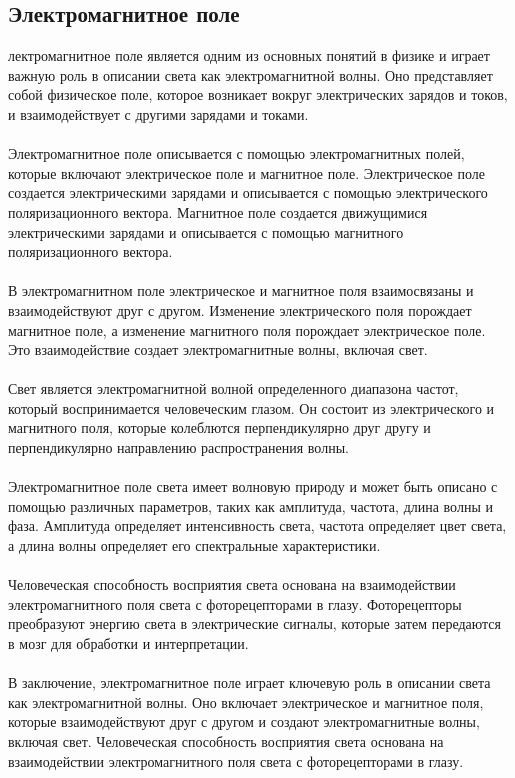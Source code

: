 \documentclass{article}
\begin{document}
\subsection{Электромагнитное поле}
лектромагнитное поле является одним из основных понятий в физике и играет важную роль в описании света как электромагнитной волны. Оно представляет собой физическое поле, которое возникает вокруг электрических зарядов и токов, и взаимодействует с другими зарядами и токами.\\
~\\
Электромагнитное поле описывается с помощью электромагнитных полей, которые включают электрическое поле и магнитное поле. Электрическое поле создается электрическими зарядами и описывается с помощью электрического поляризационного вектора. Магнитное поле создается движущимися электрическими зарядами и описывается с помощью магнитного поляризационного вектора.\\
~\\
В электромагнитном поле электрическое и магнитное поля взаимосвязаны и взаимодействуют друг с другом. Изменение электрического поля порождает магнитное поле, а изменение магнитного поля порождает электрическое поле. Это взаимодействие создает электромагнитные волны, включая свет.\\
~\\
Свет является электромагнитной волной определенного диапазона частот, который воспринимается человеческим глазом. Он состоит из электрического и магнитного поля, которые колеблются перпендикулярно друг другу и перпендикулярно направлению распространения волны.\\
~\\
Электромагнитное поле света имеет волновую природу и может быть описано с помощью различных параметров, таких как амплитуда, частота, длина волны и фаза. Амплитуда определяет интенсивность света, частота определяет цвет света, а длина волны определяет его спектральные характеристики.\\
~\\
Человеческая способность восприятия света основана на взаимодействии электромагнитного поля света с фоторецепторами в глазу. Фоторецепторы преобразуют энергию света в электрические сигналы, которые затем передаются в мозг для обработки и интерпретации.\\
~\\
В заключение, электромагнитное поле играет ключевую роль в описании света как электромагнитной волны. Оно включает электрическое и магнитное поля, которые взаимодействуют друг с другом и создают электромагнитные волны, включая свет. Человеческая способность восприятия света основана на взаимодействии электромагнитного поля света с фоторецепторами в глазу.\\
~\\
\end{document}
